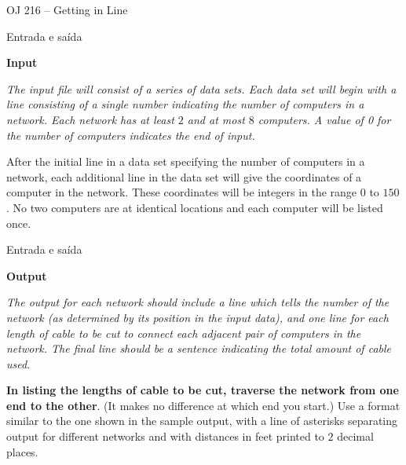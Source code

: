 \begin{frame}[fragile]{OJ 216 -- Getting in Line}
\begin{figure}[h]
    \centering

\end{figure}

\end{frame}

\begin{frame}[fragile]{Entrada e saída}

\textbf{Input}

{\it The input file will consist of a series of data sets. Each data set will begin with a line consisting of a
single number indicating the number of computers in a network. Each network has at least $2$ and at
most $8$ computers. A value of 0 for the number of computers indicates the end of input.

After the initial line in a data set specifying the number of computers in a network, each additional
line in the data set will give the coordinates of a computer in the network. These coordinates will be
integers in the range $0$ to $150$. No two computers are at identical locations and each computer will be
listed once.}

\end{frame}

\begin{frame}[fragile]{Entrada e saída}

\textbf{Output}

{\it The output for each network should include a line which tells the number of the network (as determined
by its position in the input data), and one line for each length of cable to be cut to connect each adjacent
pair of computers in the network. The final line should be a sentence indicating the total amount of
cable used.

\textbf{In listing the lengths of cable to be cut, traverse the network from one end to the
other}. (It makes no difference at which end you start.) Use a format similar to the one shown in the
sample output, with a line of asterisks separating output for different networks and with distances in
feet printed to $2$ decimal places.}

\end{frame}

